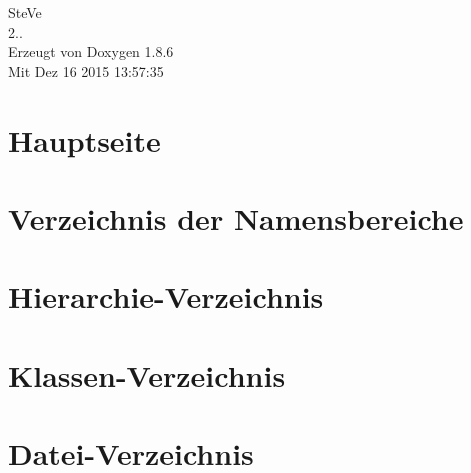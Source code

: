 \documentclass[twoside]{book}
\newcommand{\clearemptydoublepage}{%
  \newpage{\pagestyle{empty}\cleardoublepage}%
}
\begin{document}
\hypersetup{pageanchor=false}
\begin{titlepage}
\vspace*{7cm}
\begin{center}%
{\Large Ste\-Ve \\[1ex]\large 2.. }\\
\vspace*{1cm}
{\large Erzeugt von Doxygen 1.8.6}\\
\vspace*{0.5cm}
{\small Mit Dez 16 2015 13:57:35}\\
\end{center}
\end{titlepage}
\clearemptydoublepage
\tableofcontents
\clearemptydoublepage
{}
\hypersetup{pageanchor=true}

\chapter{Hauptseite}
\label{index}\hypertarget{index}{}
\chapter{Verzeichnis der Namensbereiche}

\chapter{Hierarchie-\/\-Verzeichnis}

\chapter{Klassen-\/\-Verzeichnis}

\chapter{Datei-\/\-Verzeichnis}

\end{document}
